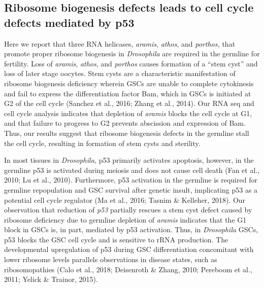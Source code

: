 \documentclass[12pt,oneside]{reedthesis}
\begin{document}
\hypertarget{ribosome-biogenesis-defects-leads-to-cell-cycle-defects-mediated-by-p53}{%
\subsection{Ribosome biogenesis defects leads to cell cycle defects mediated by p53}\label{ribosome-biogenesis-defects-leads-to-cell-cycle-defects-mediated-by-p53}}

Here we report that three RNA helicases, \emph{aramis}, \emph{athos}, and
\emph{porthos,} that promote proper ribosome biogenesis in \emph{Drosophila} are
required in the germline for fertility. Loss of \emph{aramis}, \emph{athos}, and
\emph{porthos} causes formation of a ``stem cyst'' and loss of later stage
oocytes. Stem cysts are a characteristic manifestation of ribosome
biogenesis deficiency wherein GSCs are unable to complete cytokinesis
and fail to express the differentiation factor Bam, which in GSCs is
initiated at G2 of the cell cycle (Sanchez et al., 2016; Zhang et al., 2014). Our
RNA seq and cell cycle analysis indicates that depletion of \emph{aramis}
blocks the cell cycle at G1, and that failure to progress to G2 prevents
abscission and expression of Bam. Thus, our results suggest that
ribosome biogenesis defects in the germline stall the cell cycle,
resulting in formation of stem cysts and sterility.

In most tissues in \emph{Drosophila,} p53 primarily activates apoptosis,
however, in the germline p53 is activated during meiosis and does not
cause cell death (Fan et al., 2010; Lu et al., 2010). Furthermore, p53 activation in
the germline is required for germline repopulation and GSC survival
after genetic insult, implicating p53 as a potential cell cycle
regulator (Ma et al., 2016; Tasnim \& Kelleher, 2018). Our
observation that reduction of \emph{p53} partially rescues a stem cyst defect
caused by ribosome deficiency due to germline depletion of \emph{aramis}
indicates that the G1 block in GSCs is, in part, mediated by p53
activation. Thus, in \emph{Drosophila} GSCs, p53 blocks the GSC cell cycle
and is sensitive to rRNA production. The developmental upregulation of
p53 during GSC differentiation concomitant with lower ribosome levels
parallels observations in disease states, such as ribosomopathies
(Calo et al., 2018; Deisenroth \& Zhang, 2010; Pereboom et al., 2011; Yelick \& Trainor, 2015).
\end{document}

